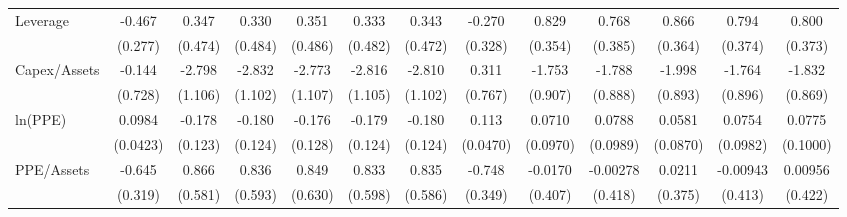 {\begin{tabular}{l*{12}{c}}
Leverage            &      -0.467\sym{*}  &       0.347         &       0.330         &       0.351         &       0.333         &       0.343         &      -0.270         &       0.829\sym{**} &       0.768\sym{*}  &       0.866\sym{**} &       0.794\sym{**} &       0.800\sym{**} \\
                    &     (0.277)         &     (0.474)         &     (0.484)         &     (0.486)         &     (0.482)         &     (0.472)         &     (0.328)         &     (0.354)         &     (0.385)         &     (0.364)         &     (0.374)         &     (0.373)         \\
Capex/Assets        &      -0.144         &      -2.798\sym{**} &      -2.832\sym{**} &      -2.773\sym{**} &      -2.816\sym{**} &      -2.810\sym{**} &       0.311         &      -1.753\sym{*}  &      -1.788\sym{**} &      -1.998\sym{**} &      -1.764\sym{*}  &      -1.832\sym{**} \\
                    &     (0.728)         &     (1.106)         &     (1.102)         &     (1.107)         &     (1.105)         &     (1.102)         &     (0.767)         &     (0.907)         &     (0.888)         &     (0.893)         &     (0.896)         &     (0.869)         \\
ln(PPE)             &      0.0984\sym{**} &      -0.178         &      -0.180         &      -0.176         &      -0.179         &      -0.180         &       0.113\sym{**} &      0.0710         &      0.0788         &      0.0581         &      0.0754         &      0.0775         \\
                    &    (0.0423)         &     (0.123)         &     (0.124)         &     (0.128)         &     (0.124)         &     (0.124)         &    (0.0470)         &    (0.0970)         &    (0.0989)         &    (0.0870)         &    (0.0982)         &    (0.1000)         \\
PPE/Assets          &      -0.645\sym{**} &       0.866         &       0.836         &       0.849         &       0.833         &       0.835         &      -0.748\sym{**} &     -0.0170         &    -0.00278         &      0.0211         &    -0.00943         &     0.00956         \\
                    &     (0.319)         &     (0.581)         &     (0.593)         &     (0.630)         &     (0.598)         &     (0.586)         &     (0.349)         &     (0.407)         &     (0.418)         &     (0.375)         &     (0.413)         &     (0.422)         \\

\end{tabular}}
